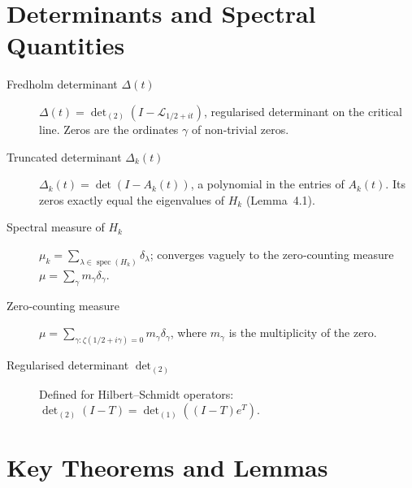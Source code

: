 \documentclass[11pt,a4paper]{article}
\begin{document}
\section*{Determinants and Spectral Quantities}

\begin{description}
\item[Fredholm determinant \(\Delta(t)\)] \(\Delta(t) = \det_{(2)}(I-\mathcal{L}_{1/2+it})\), regularised determinant on the critical line. Zeros are the ordinates \(\gamma\) of non‑trivial zeros. \cite{RHproof,DeterminantProof}
\item[Truncated determinant \(\Delta_k(t)\)] \(\Delta_k(t) = \det(I-A_k(t))\), a polynomial in the entries of \(A_k(t)\). Its zeros exactly equal the eigenvalues of \(H_k\) (Lemma~4.1). \cite{RHproof,SpectralFlowLemma}
\item[Spectral measure of \(H_k\)] \(\mu_k = \sum_{\lambda\in\operatorname{spec}(H_k)}\delta_\lambda\); converges vaguely to the zero‑counting measure \(\mu = \sum_\gamma m_\gamma \delta_\gamma\). \cite{RHproof}
\item[Zero‑counting measure] \(\mu = \sum_{\gamma:\zeta(1/2+i\gamma)=0} m_\gamma \delta_\gamma\), where \(m_\gamma\) is the multiplicity of the zero. \cite{RHproof}
\item[Regularised determinant \(\det\nolimits_{(2)}\)] Defined for Hilbert–Schmidt operators: \(\det\nolimits_{(2)}(I-T) = \det\nolimits_{(1)}((I-T)e^T)\). \cite{TraceClass}
\end{description}

\section*{Key Theorems and Lemmas}
\end{document}
